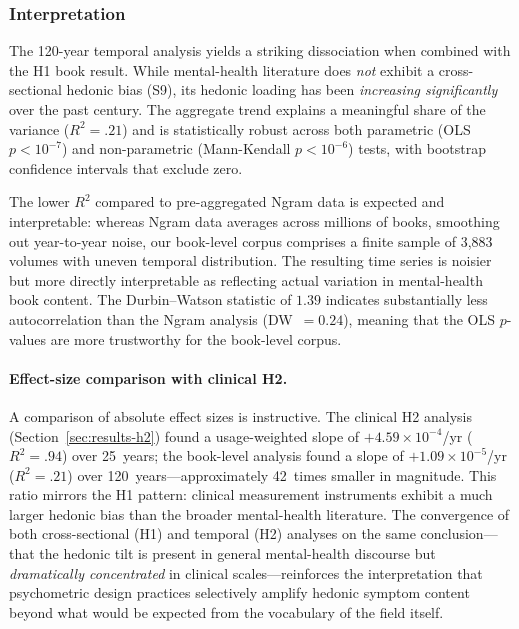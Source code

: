 \documentclass[12pt,a4paper]{article}
\begin{document}
\subsubsection*{Interpretation}

The 120-year temporal analysis yields a striking dissociation when combined with the H1 book result.
While mental-health literature does \textit{not} exhibit a cross-sectional hedonic bias (S9), its hedonic loading has been \textit{increasing significantly} over the past century.
The aggregate trend explains a meaningful share of the variance ($R^2 = .21$) and is statistically robust across both parametric (OLS $p < 10^{-7}$) and non-parametric (Mann-Kendall $p < 10^{-6}$) tests, with bootstrap confidence intervals that exclude zero.

The lower $R^2$ compared to pre-aggregated Ngram data is expected and interpretable: whereas Ngram data averages across millions of books, smoothing out year-to-year noise, our book-level corpus comprises a finite sample of 3{,}883 volumes with uneven temporal distribution.
The resulting time series is noisier but more directly interpretable as reflecting actual variation in mental-health book content.
The Durbin--Watson statistic of $1.39$ indicates substantially less autocorrelation than the Ngram analysis (DW~$= 0.24$), meaning that the OLS $p$-values are more trustworthy for the book-level corpus.

\paragraph{Effect-size comparison with clinical H2.}
A comparison of absolute effect sizes is instructive.
The clinical H2 analysis (Section~\ref{sec:results-h2}) found a usage-weighted slope of $+4.59 \times 10^{-4}$/yr ($R^2 = .94$) over 25~years; the book-level analysis found a slope of $+1.09 \times 10^{-5}$/yr ($R^2 = .21$) over 120~years---approximately 42~times smaller in magnitude.
This ratio mirrors the H1 pattern: clinical measurement instruments exhibit a much larger hedonic bias than the broader mental-health literature.
The convergence of both cross-sectional (H1) and temporal (H2) analyses on the same conclusion---that the hedonic tilt is present in general mental-health discourse but \textit{dramatically concentrated} in clinical scales---reinforces the interpretation that psychometric design practices selectively amplify hedonic symptom content beyond what would be expected from the vocabulary of the field itself.
\end{document}
